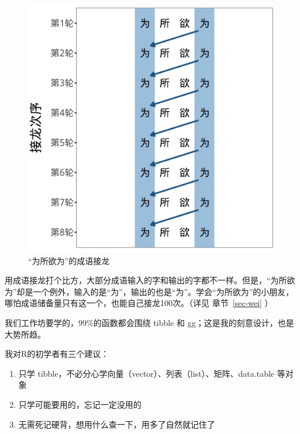 \documentclass[
  letterpaper,
]{ctexbook}
\providecommand{\tightlist}{%
  \setlength{\itemsep}{0pt}\setlength{\parskip}{0pt}}\usepackage{longtable,booktabs,array}
\begin{document}
\begin{figure}
\begin{minipage}[t]{0.50\linewidth}
{{\includegraphics{fig/word_chain_long.png}

}

\caption{\label{fig-long}``为所欲为''的成语接龙}

}

\end{minipage}%

\end{figure}

用成语接龙打个比方，大部分成语输入的字和输出的字都不一样。但是，``为所欲为''却是一个例外，输入的是``为''，输出的也是``为''。学会``为所欲为''的小朋友，哪怕成语储备量只有这一个，也能自己接龙100次。（详见
章节~\ref{sec-wei} ）

我们工作坊要学的，99\%的函数都会围绕 tibble 和
gg；这是我的刻意设计，也是大势所趋。

我对R的初学者有三个建议：

\begin{enumerate}
\def\labelenumi{\arabic{enumi}.}
\tightlist
\item
  只学 tibble，不必分心学向量（vector）、列表（list）、矩阵、data.table
  等对象
\item
  只学可能要用的，忘记一定没用的
\item
  无需死记硬背，想用什么查一下，用多了自然就记住了
\end{enumerate}
\end{document}
